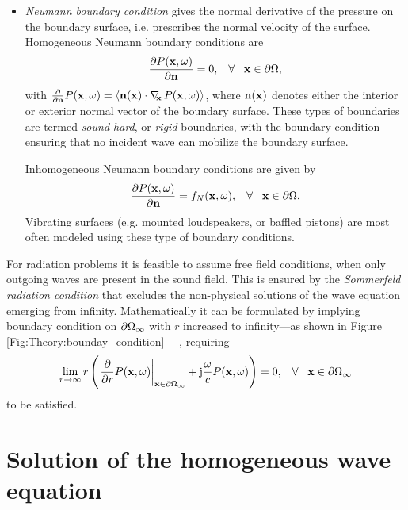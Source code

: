 \begin{itemize}
\item \emph{Neumann boundary condition} gives the normal derivative of the pressure on the boundary surface, i.e. prescribes the normal velocity of the surface.
Homogeneous Neumann boundary conditions are
\begin{equation}
\frac{\partial P(\mathbf{x},\omega)}{\partial \mathbf{n}} = 0, \hspace{3mm} \forall \hspace{3mm}  \mathbf{x} \in \partial \Omega,
\end{equation}
with $\frac{\partial}{\partial \mathbf{n}} P(\mathbf{x},\omega) = \left< \mathbf{n}(\mathbf{x}) \cdot \nabla_{\!\!\mathbf{x}}\, P(\mathbf{x},\omega) \right>$, where $ \mathbf{n}(\mathbf{x}) $ denotes either the interior or exterior normal vector of the boundary surface.
These types of boundaries are termed \emph{sound hard}, or \emph{rigid} boundaries, with the boundary condition ensuring that no incident wave can mobilize the boundary surface.

Inhomogeneous Neumann boundary conditions are given by
\begin{equation}
\frac{\partial P(\mathbf{x},\omega)}{\partial \mathbf{n}} = f_N(\mathbf{x},\omega), \hspace{3mm} \forall \hspace{3mm}  \mathbf{x} \in \partial \Omega.
\end{equation}
Vibrating surfaces (e.g. mounted loudspeakers, or baffled pistons) are most often modeled using these type of boundary conditions.
\end{itemize}

For radiation problems it is feasible to assume free field conditions, when only outgoing waves are present in the sound field. 
This is ensured by the \emph{Sommerfeld radiation condition} that excludes the non-physical solutions of the wave equation emerging from infinity.
Mathematically it can be formulated by implying boundary condition on $\partial \Omega_{\infty}$ with $r$ increased to infinity---as shown in Figure \ref{Fig:Theory:bounday_condition} \cite{Schot1992:Eighty_years, Williams1999}---, requiring
\begin{equation}
\lim_{r \rightarrow \infty} r \left( \left. \frac{\partial}{\partial r}P(\mathbf{x},\omega)\right|_{\mathbf{x} \in \partial \Omega_{\infty}} +\mathrm{j} \frac{\omega}{c}P(\mathbf{x},\omega) \right) = 0, \hspace{3mm} \forall \hspace{3mm} \mathbf{x} \in \partial \Omega_{\infty}
\label{Eq:Theory:Sommerfeld_radiation_condition}
\end{equation}
to be satisfied.

\section{Solution of the homogeneous wave equation}

